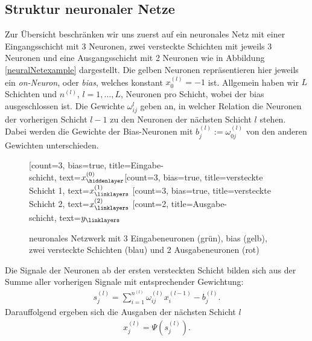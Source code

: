 \subsection{Struktur neuronaler Netze}
\label{subsec:struktur-eines-neuronalen-netzes}
Zur Übersicht beschränken wir uns zuerst auf ein neuronales Netz mit einer Eingangsschicht mit $3$ Neuronen, zwei
versteckte Schichten mit jeweils 3 Neuronen und eine Ausgangsschicht mit 2 Neuronen wie in Abbildung
\eqref{neuralNetexample} dargestellt. Die gelben Neuronen repräsentieren hier jeweils ein \textit{on-Neuron}, oder
\textit{bias}, welches konstant $x_0^{(l)} = -1$ ist. Allgemein haben wir $L$ Schichten und $n^{(l)}$, $l=1, \dots, L$,
Neuronen pro Schicht, wobei der bias ausgeschlossen ist. Die Gewichte $\omega_{ij}^{l}$ geben an, in welcher Relation
die Neuronen der vorherigen Schicht $l-1$ zu den Neuronen der nächsten Schicht $l$ stehen. Dabei werden die Gewichte
der Bias-Neuronen mit $b_j^{(l)}:= \omega_{0j}^{(l)}$ von den anderen Gewichten unterschieden.
\begin{figure}[htp]
    \centering
    \begin{neuralnetwork}[height=4]
        \newcommand{\x}[2]{$x^{(0)}_#2$}
        \newcommand{\y}[2]{$y_#2$}
        \newcommand{\hfirst}[2]{\small $x^{(1)}_#2$}
        \newcommand{\hsecond}[2]{\small $x^{(2)}_#2$}
        [count=3, bias=true, title=Eingabe-\\schicht, text=\x]
        \hiddenlayer[count=3, bias=true, title=versteckte\\Schicht 1, text=\hfirst]
        \linklayers
        \hiddenlayer[count=3, bias=true, title=versteckte\\Schicht 2, text=\hsecond]
        \linklayers
        \outputlayer[count=2, title=Ausgabe-\\schicht, text=\y] \linklayers
    \end{neuralnetwork}
    \caption{neuronales Netzwerk mit 3 Eingabeneuronen (grün), bias (gelb), zwei versteckte Schichten
        (blau) und 2 Ausgabeneuronen (rot)}
    \label{neuralNetexample}
\end{figure}
Die Signale der Neuronen ab der ersten versteckten Schicht bilden sich aus der Summe aller vorherigen
Signale mit entsprechender Gewichtung:
\begin{align}
    s_j^{(l)} = \sum_{i=1}^{n^{(l)}} \omega_{ij}^{(l)} x_i^{(l-1)} - b_j^{(l)}. \label{eq:signal}
\end{align}
Darauffolgend ergeben sich die Ausgaben der nächsten Schicht $l$
\begin{align}
    x_j^{(l)}=\Psi(s_j^{(l)}). \label{eq:activ}
\end{align}
